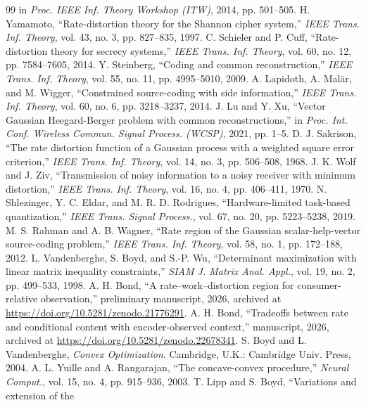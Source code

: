 \documentclass[11pt,onecolumn]{IEEEtran}
\begin{document}
\begin{thebibliography}{99}
in \emph{Proc. IEEE Inf. Theory Workshop (ITW)}, 2014, pp. 501--505.
 H. Yamamoto, ``Rate-distortion theory for the Shannon
cipher system,'' \emph{IEEE Trans. Inf. Theory}, vol. 43, no. 3, pp. 827--835,
1997.
 C. Schieler and P. Cuff, ``Rate-distortion theory for
secrecy systems,'' \emph{IEEE Trans. Inf. Theory}, vol. 60, no. 12,
pp. 7584--7605, 2014.
 Y. Steinberg, ``Coding and common reconstruction,''
\emph{IEEE Trans. Inf. Theory}, vol. 55, no. 11, pp. 4995--5010, 2009.
 A. Lapidoth, A. Mal\"ar, and M. Wigger, ``Constrained
source-coding with side information,'' \emph{IEEE Trans. Inf. Theory},
vol. 60, no. 6, pp. 3218--3237, 2014.
 J. Lu and Y. Xu, ``Vector Gaussian Heegard-Berger problem
with common reconstructions,'' in \emph{Proc. Int. Conf. Wireless Commun.
Signal Process. (WCSP)}, 2021, pp. 1--5.
 D. J. Sakrison, ``The rate distortion function of a
Gaussian process with a weighted square error criterion,'' \emph{IEEE Trans.
Inf. Theory}, vol. 14, no. 3, pp. 506--508, 1968.
 J. K. Wolf and J. Ziv, ``Transmission of noisy
information to a noisy receiver with minimum distortion,'' \emph{IEEE
Trans. Inf. Theory}, vol. 16, no. 4, pp. 406--411, 1970.
 N. Shlezinger, Y. C. Eldar, and M. R. D. Rodrigues,
``Hardware-limited task-based quantization,'' \emph{IEEE Trans. Signal
Process.}, vol. 67, no. 20, pp. 5223--5238, 2019.
 M. S. Rahman and A. B. Wagner, ``Rate region of the
Gaussian scalar-help-vector source-coding problem,'' \emph{IEEE Trans. Inf.
Theory}, vol. 58, no. 1, pp. 172--188, 2012.
 L. Vandenberghe, S. Boyd, and S.-P. Wu,
``Determinant maximization with linear matrix inequality constraints,''
\emph{SIAM J. Matrix Anal. Appl.}, vol. 19, no. 2, pp. 499--533, 1998.
 A. H. Bond, ``A rate--work--distortion region for
consumer-relative observation,'' preliminary manuscript, 2026, archived at
\url{https://doi.org/10.5281/zenodo.21776291}.
 A. H. Bond, ``Tradeoffs between rate and conditional
content with encoder-observed context,'' manuscript, 2026, archived at
\url{https://doi.org/10.5281/zenodo.22678341}.
 S. Boyd and L. Vandenberghe, \emph{Convex Optimization}.
Cambridge, U.K.: Cambridge Univ. Press, 2004.
 A. L. Yuille and A. Rangarajan, ``The concave-convex
procedure,'' \emph{Neural Comput.}, vol. 15, no. 4, pp. 915--936, 2003.
 T. Lipp and S. Boyd, ``Variations and extension of the

\end{thebibliography}
\end{document}

